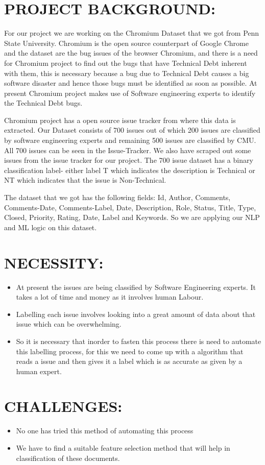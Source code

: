 \section{\uppercase{Project Background:}}
For our project we are working on the Chromium Dataset that we got from Penn State University. Chromium is the open source counterpart of Google Chrome and the dataset are the bug issues of the browser Chromium, and there is a need for Chromium project to find out the bugs that have Technical Debt inherent with them, this is necessary because a bug due to Technical Debt causes a big software disaster and hence those bugs must be identified as soon as possible. At present Chromium project makes use of Software engineering experts to identify the Technical Debt bugs.
\par Chromium project has a open source issue tracker from where this data is extracted. Our Dataset consists of 700 issues out of which 200 issues are classified by software engineering experts and remaining 500 issues are classified by CMU. All 700 issues can be seen in the Issue-Tracker. We also have scraped out some issues from the issue tracker for our project. The 700 issue dataset has a binary classification label- either label T which indicates the description is Technical or NT which indicates that the issue is Non-Technical.
\par The dataset that we got has the following fields: Id, Author, Comments, Comments-Date, Comments-Label, Date, Description, Role, Status, Title, Type, Closed, Priority, Rating, Date, Label and Keywords. So we are applying our NLP and ML logic on this dataset.
\section{\uppercase{Necessity:}}
\begin{itemize}
\item At present the issues are being classified by Software Engineering experts. It takes a lot of time and money as it involves human Labour. 
\item Labelling each issue involves looking into a great amount of data about that issue which can be overwhelming.
\item So it is necessary that inorder to fasten this process there is need to automate this labelling process, for this we need to come up with a algorithm that reads a issue and then gives it a label which is as accurate as given by a human expert.
\end{itemize}
\section{\uppercase{Challenges:}}
\begin{itemize}
\item No one has tried this method of automating this process
\item We have to find a suitable feature selection method that will help in classification of these documents.
\end{itemize}
